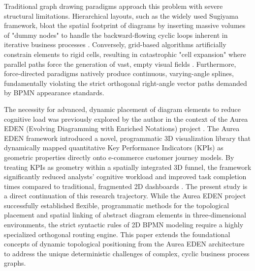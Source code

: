 \documentclass{article}
\begin{document}
	Traditional graph drawing paradigms approach this problem with severe structural limitations. Hierarchical layouts, such as the widely used Sugiyama framework, bloat the spatial footprint of diagrams by inserting massive volumes of "dummy nodes" to handle the backward-flowing cyclic loops inherent in iterative business processes \cite{ref_sugiyama, ref_gansner, ref_brandes}. Conversely, grid-based algorithms artificially constrain elements to rigid cells, resulting in catastrophic "cell expansion" where parallel paths force the generation of vast, empty visual fields \cite{ref_kitzmann}. Furthermore, force-directed paradigms natively produce continuous, varying-angle splines, fundamentally violating the strict orthogonal right-angle vector paths demanded by BPMN appearance standards.
	
	The necessity for advanced, dynamic placement of diagram elements to reduce cognitive load was previously explored by the author in the context of the Aurea EDEN (Evolving Diagramming with Enriched Notations) project \cite{ref_waszkowski}. The Aurea EDEN framework introduced a novel, programmatic 3D visualization library that dynamically mapped quantitative Key Performance Indicators (KPIs) as geometric properties directly onto e-commerce customer journey models. By treating KPIs as geometry within a spatially integrated 3D funnel, the framework significantly reduced analysts' cognitive workload and improved task completion times compared to traditional, fragmented 2D dashboards \cite{ref_waszkowski}. The present study is a direct continuation of this research trajectory. While the Aurea EDEN project successfully established flexible, programmatic methods for the topological placement and spatial linking of abstract diagram elements in three-dimensional environments, the strict syntactic rules of 2D BPMN modeling require a highly specialized orthogonal routing engine. This paper extends the foundational concepts of dynamic topological positioning from the Aurea EDEN architecture to address the unique deterministic challenges of complex, cyclic business process graphs.
	
\end{document}
